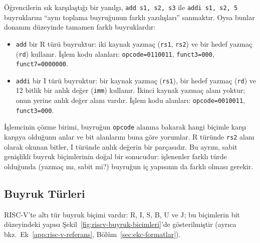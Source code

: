 Öğrencilerin sık karşılaştığı bir yanılgı, \texttt{add s1, s2, s3} ile \texttt{addi s1, s2, 5} buyruklarını ``aynı toplama buyruğunun farklı yazılışları'' sanmaktır. Oysa bunlar donanım düzeyinde tamamen farklı buyruklardır:

\begin{itemize}[nosep]
\item \texttt{add} bir R türü buyruktur: iki kaynak yazmaç (\texttt{rs1}, \texttt{rs2}) ve bir hedef yazmaç (\texttt{rd}) kullanır. İşlem kodu alanları: \texttt{opcode=0110011}, \texttt{funct3=000}, \texttt{funct7=0000000}.
\item \texttt{addi} bir I türü buyruktur: bir kaynak yazmaç (\texttt{rs1}), bir hedef yazmaç (\texttt{rd}) ve 12 bitlik bir anlık değer (\texttt{imm}) kullanır. İkinci kaynak yazmaç alanı yoktur; onun yerine anlık değer alanı vardır. İşlem kodu alanları: \texttt{opcode=0010011}, \texttt{funct3=000}.
\end{itemize}

İşlemcinin çözme birimi, buyruğun \texttt{opcode} alanına bakarak hangi biçimle karşı karşıya olduğunu anlar ve bit alanlarını buna göre yorumlar. R türünde \texttt{rs2} alanı olarak okunan bitler, I türünde anlık değerin bir parçasıdır. Bu ayrım, sabit genişlikli buyruk biçimlerinin doğal bir sonucudur: işlenenler farklı türde olduğunda (yazmaç mı, sabit mi?) buyruğun iç yapısının da farklı olması gerekir.

\subsection{Buyruk Türleri}

RISC-V'te altı tür buyruk biçimi vardır: R, I, S, B, U ve J; bu biçimlerin bit düzeyindeki yapısı Şekil~\ref{fig:riscv-buyruk-bicimleri}'de gösterilmiştir (ayrıca bkz.\ Ek~\ref{app:risc-v-referans}, Bölüm~\ref{sec:ekc-formatlar}).

